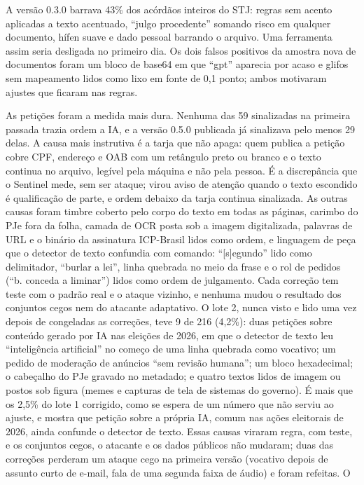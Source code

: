 \documentclass[
  brazilian,
  11pt,
]{article}
\begin{document}
A versão 0.3.0 barrava 43\% dos acórdãos inteiros do STJ: regras sem
acento aplicadas a texto acentuado, ``julgo procedente'' somando risco
em qualquer documento, hífen suave e dado pessoal barrando o arquivo.
Uma ferramenta assim seria desligada no primeiro dia. Os dois falsos
positivos da amostra nova de documentos foram um bloco de base64 em que
``gpt'' aparecia por acaso e glifos sem mapeamento lidos como lixo em
fonte de 0,1 ponto; ambos motivaram ajustes que ficaram nas regras.

As petições foram a medida mais dura. Nenhuma das 59 sinalizadas na
primeira passada trazia ordem a IA, e a versão 0.5.0 publicada já
sinalizava pelo menos 29 delas. A causa mais instrutiva é a tarja que
não apaga: quem publica a petição cobre CPF, endereço e OAB com um
retângulo preto ou branco e o texto continua no arquivo, legível pela
máquina e não pela pessoa. É a discrepância que o Sentinel mede, sem ser
ataque; virou aviso de atenção quando o texto escondido é qualificação
de parte, e ordem debaixo da tarja continua sinalizada. As outras causas
foram timbre coberto pelo corpo do texto em todas as páginas, carimbo do
PJe fora da folha, camada de OCR posta sob a imagem digitalizada,
palavras de URL e o binário da assinatura ICP-Brasil lidos como ordem, e
linguagem de peça que o detector de texto confundia com comando:
``{[}s{]}egundo'' lido como delimitador, ``burlar a lei'', linha
quebrada no meio da frase e o rol de pedidos (``b. conceda a liminar'')
lidos como ordem de julgamento. Cada correção tem teste com o padrão
real e o ataque vizinho, e nenhuma mudou o resultado dos conjuntos cegos
nem do atacante adaptativo. O lote 2, nunca visto e lido uma vez depois
de congeladas as correções, teve 9 de 216 (4,2\%): duas petições sobre
conteúdo gerado por IA nas eleições de 2026, em que o detector de texto
leu ``inteligência artificial'' no começo de uma linha quebrada como
vocativo; um pedido de moderação de anúncios ``sem revisão humana''; um
bloco hexadecimal; o cabeçalho do PJe gravado no metadado; e quatro
textos lidos de imagem ou postos sob figura (memes e capturas de tela de
sistemas do governo). É mais que os 2,5\% do lote 1 corrigido, como se
espera de um número que não serviu ao ajuste, e mostra que petição sobre
a própria IA, comum nas ações eleitorais de 2026, ainda confunde o
detector de texto. Essas causas viraram regra, com teste, e os conjuntos
cegos, o atacante e os dados públicos não mudaram; duas das correções
perderam um ataque cego na primeira versão (vocativo depois de assunto
curto de e-mail, fala de uma segunda faixa de áudio) e foram refeitas. O
\end{document}
